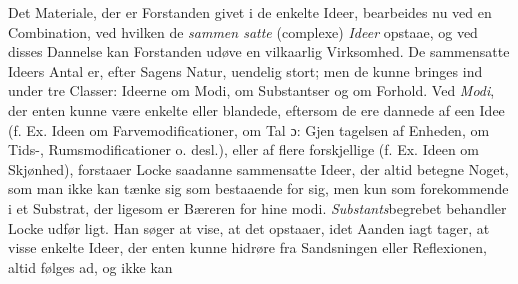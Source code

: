 \documentclass[12pt,a4paper]{book}
\begin{document}
Det Materiale, der er Forstanden givet i de enkelte Ideer,
bearbeides nu ved en Combination, ved hvilken de \emph{sammen\-%
satte} (complexe) \emph{Ideer} opstaae, og ved disses Dannelse kan
Forstanden udøve en vilkaarlig Virksomhed. De sammensatte
Ideers Antal er, efter Sagens Natur, uendelig stort; men de
kunne bringes ind under tre Classer: Ideerne om Modi, om
Substantser og om Forhold. Ved \emph{Modi}, der enten kunne
være enkelte eller blandede, eftersom de ere dannede af een
Idee (f. Ex. Ideen om Farvemodificationer, om Tal ɔ: Gjen\-%
tagelsen af Enheden, om Tids-, Rumsmodificationer o. desl.),
eller af flere forskjellige (f. Ex. Ideen om Skjønhed), forstaaer
Locke saadanne sammensatte Ideer, der altid betegne Noget,
som man ikke kan tænke sig som bestaaende for sig, men
kun som forekommende i et Substrat, der ligesom er Bæreren
for hine modi. \emph{Substants}begrebet behandler Locke udfør\-%
ligt. Han søger at vise, at det opstaaer, idet Aanden iagt\-%
tager, at visse enkelte Ideer, der enten kunne hidrøre fra
Sandsningen eller Reflexionen, altid følges ad, og ikke kan
\end{document}
